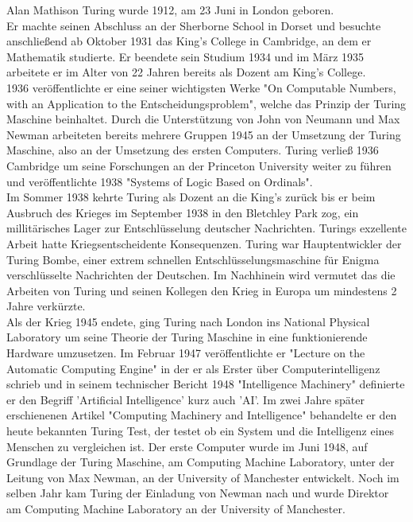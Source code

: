 Alan Mathison Turing wurde 1912, am 23 Juni in London geboren.\\
Er machte seinen Abschluss an der Sherborne School in Dorset und besuchte anschließend ab Oktober 1931 das King's College in Cambridge, an dem er Mathematik studierte. Er beendete sein Studium 1934 und im März 1935 arbeitete er im Alter von 22 Jahren bereits als Dozent am King's College.\\
1936 veröffentlichte er eine seiner wichtigsten Werke "On Computable Numbers, with an Application to the Entscheidungsproblem", welche das Prinzip der Turing Maschine beinhaltet. Durch die Unterstützung von John von Neumann und Max Newman arbeiteten bereits mehrere Gruppen 1945 an der Umsetzung der Turing Maschine, also an der Umsetzung des ersten Computers. Turing verließ 1936 Cambridge um seine Forschungen an der Princeton University weiter zu führen und veröffentlichte 1938 "Systems of Logic Based on Ordinals".\\ 
Im Sommer 1938 kehrte Turing als Dozent an die King's zurück bis er beim Ausbruch des Krieges im September 1938 in den Bletchley Park zog, ein millitärisches Lager zur Entschlüsselung deutscher Nachrichten. Turings exzellente Arbeit hatte Kriegsentscheidente Konsequenzen. Turing war Hauptentwickler der Turing Bombe, einer extrem schnellen Entschlüsselungsmaschine für Enigma verschlüsselte Nachrichten der Deutschen. Im Nachhinein wird vermutet das die Arbeiten von Turing und seinen Kollegen den Krieg in Europa um mindestens 2 Jahre verkürzte.\\
Als der Krieg 1945 endete, ging Turing nach London ins National Physical Laboratory um seine Theorie der Turing Maschine in eine funktionierende Hardware umzusetzen. Im Februar 1947 veröffentlichte er "Lecture on the Automatic Computing Engine" in der er als Erster über Computerintelligenz schrieb und in seinem technischer Bericht 1948 "Intelligence Machinery" definierte er den Begriff 'Artificial Intelligence' kurz auch 'AI'. Im zwei Jahre später erschienenen Artikel "Computing Machinery and Intelligence" behandelte er den heute bekannten Turing Test, der testet ob ein System und die Intelligenz eines Menschen zu vergleichen ist.
Der erste Computer wurde im Juni 1948, auf Grundlage der Turing Maschine, am Computing Machine Laboratory, unter der Leitung von Max Newman, an der University of Manchester entwickelt. Noch im selben Jahr kam Turing der Einladung von Newman nach und wurde Direktor am Computing Machine Laboratory an der University of Manchester.\\
